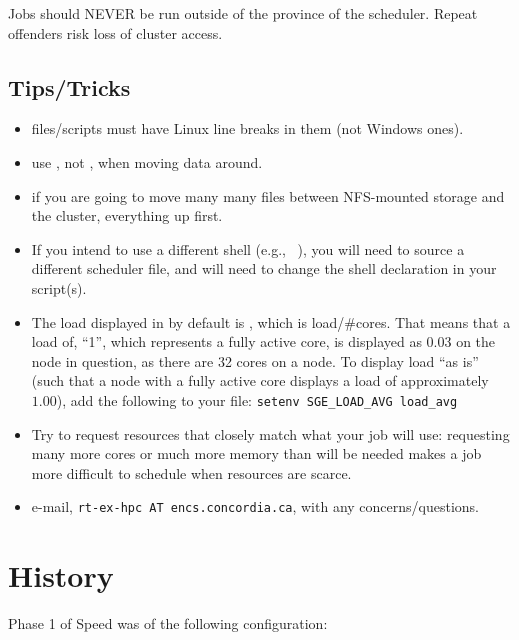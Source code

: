 \documentclass{easychair}
\begin{document}
Jobs should NEVER be run outside of the province of the scheduler. Repeat offenders risk loss of cluster access. 

\subsection{Tips/Tricks}

\begin{itemize}
\item
files/scripts must have Linux line breaks in them (not Windows ones).
\item
use , not , when moving data around. 
\item
if you are going to move many many files between NFS-mounted storage and the 
cluster,  everything up first. 
\item
If you intend to use a different shell (e.g., ~\cite{aosa-book-vol1-bash}), you will need to source a different scheduler file, and will need to change the shell declaration in your script(s).
\item
The load displayed in  by default is , which is load/\#cores. That means that a load of, ``1'', which represents a fully active core, is displayed as $0.03$ on the  node in question, as there are 32 cores on a node. To display load ``as is'' (such that a node with a fully active core displays a load of approximately $1.00$), add the following to your  file: \texttt{setenv SGE\_LOAD\_AVG load\_avg}
\item
Try to request resources that closely match what your job will use: requesting many  more cores or much more memory than will be needed makes a job more difficult to schedule when resources are scarce.  
\item
e-mail, \texttt{rt-ex-hpc AT encs.concordia.ca}, with any concerns/questions.
\end{itemize}

\appendix

\section{History}

Phase 1 of Speed was of the following configuration:
\end{document}

